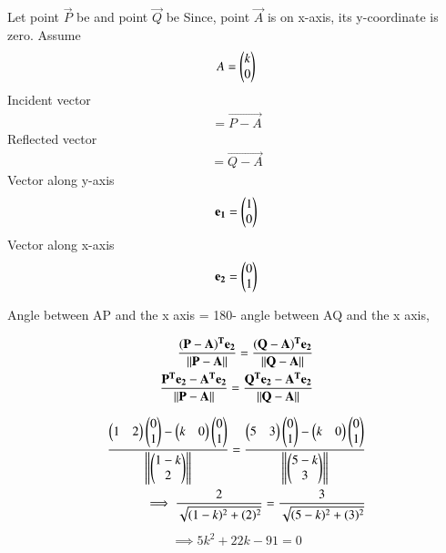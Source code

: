 Let point $\vec{P}$ be  and point $\vec{Q}$ be 
Since, point $\vec{A}$ is on x-axis, its y-coordinate is zero.
Assume \begin{align}
    A=\begin{pmatrix}k\\0\end{pmatrix}
\end{align}
Incident vector
 \begin{align}
     = \vec{P-A}
\end{align}
Reflected vector 
\begin{align}
    = \vec{Q-A}
\end{align}
Vector along y-axis
\begin{align}
\mathbf{e_1} =\begin{pmatrix}1\\0\end{pmatrix}\\
\end{align}
Vector along x-axis
\begin{align}
 \mathbf{e_2} =\begin{pmatrix}0\\1\end{pmatrix}
\end{align}

Angle between AP and the x axis = 180\degree - angle between AQ and the x axis,

\begin{align}
\dfrac{\vec{(P-A)^T} \Vec{e_2}}{\norm{\Vec{P-A}}}=\dfrac{\vec{(Q-A)^T} \Vec{e_2}}{\norm{\Vec{Q-A}}}
\\
\dfrac{\vec{P^T}\Vec{e_2}-\Vec{A^T}\Vec{e_2}}{ \norm{\Vec{P-A}}}=\dfrac{\vec{Q^T}\Vec{e_2}-\Vec{A^T}\Vec{e_2}}{\norm{\Vec{Q-A}}}
\end{align}

\begin{align}
 \dfrac{\begin{pmatrix}1 & 2\end{pmatrix}\begin{pmatrix}0\\1\end{pmatrix}-\begin{pmatrix}k & 0\end{pmatrix}\begin{pmatrix}0\\1\end{pmatrix}}{\left\lVert\begin{pmatrix}1-k \\ 2\end{pmatrix}\right\rVert}=\dfrac{\begin{pmatrix}5 & 3\end{pmatrix}\begin{pmatrix}0\\1\end{pmatrix}-\begin{pmatrix}k & 0\end{pmatrix}\begin{pmatrix}0\\1\end{pmatrix}}{\left\lVert\begin{pmatrix}5-k\\3\end{pmatrix}\right\rVert}
 \\
 \implies \dfrac{2}{\sqrt{(1-k)^2+(2)^2}}=\dfrac{3}{\sqrt{(5-k)^2+(3)^2}}
\end{align}
\begin{align}
    \label{eq:solutions/line_plane/59/output1}
       \implies 5k^2+22k-91=0 
\end{align}

